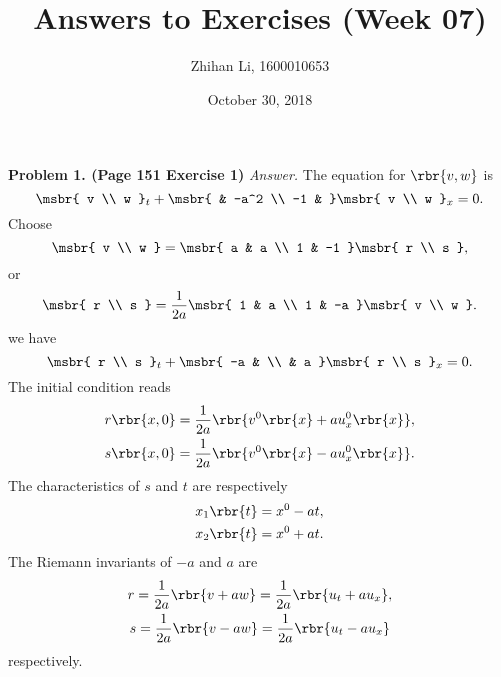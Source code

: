 \documentclass[english, nochinese]{pnote}
\title{Answers to Exercises (Week 07)}
\author{Zhihan Li, 1600010653}
\date{October 30, 2018}
\begin{document}
\maketitle

\textbf{Problem 1. (Page 151 Exercise 1)} \textit{Answer.} The equation for $ \rbr{ v, w } $ is
\begin{equation}
\msbr{ v \\ w }_t + \msbr{ & -a^2 \\ -1 & } \msbr{ v \\ w }_x = 0.
\end{equation}
Choose
\begin{equation}
\msbr{ v \\ w } = \msbr{ a & a \\ 1 & -1 } \msbr{ r \\ s },
\end{equation}
or
\begin{equation}
\msbr{ r \\ s } = \frac{1}{ 2 a } \msbr{ 1 & a \\ 1 & -a } \msbr{ v \\ w }.
\end{equation}
we have
\begin{equation}
\msbr{ r \\ s }_t + \msbr{ -a & \\ & a } \msbr{ r \\ s }_x = 0.
\end{equation}
The initial condition reads
\begin{gather}
r \rbr{ x, 0 } = \frac{1}{ 2 a } \rbr{ v^0 \rbr{x} + a u^0_x \rbr{x} }, \\
s \rbr{ x, 0 } = \frac{1}{ 2 a } \rbr{ v^0 \rbr{x} - a u^0_x \rbr{x} }.
\end{gather}
The characteristics of $s$ and $t$ are respectively
\begin{gather}
x_1 \rbr{t} = x^0 - a t, \\
x_2 \rbr{t} = x^0 + a t.
\end{gather}
The Riemann invariants of $-a$ and $a$ are
\begin{gather}
r = \frac{1}{ 2 a } \rbr{ v + a w } = \frac{1}{ 2 a } \rbr{ u_t + a u_x }, \\
s = \frac{1}{ 2 a } \rbr{ v - a w } = \frac{1}{ 2 a } \rbr{ u_t - a u_x }
\end{gather}
respectively.
\end{document}
